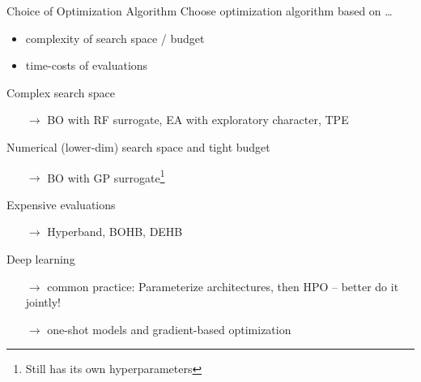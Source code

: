 \begin{frame}{Choice of Optimization Algorithm}
  Choose optimization algorithm based on \ldots
  \begin{itemize}
    \item complexity of search space / budget
    \item time-costs of evaluations
  \end{itemize}

  \vspace{0.5em}

  Complex search space
  \begin{itemize}
    \item[$\rightarrow$] BO with RF surrogate, EA with exploratory character, TPE 
  \end{itemize}
  \pause
  Numerical (lower-dim) search space and tight budget
  \begin{itemize}
    \item[$\rightarrow$] BO with GP surrogate\footnote{Still has its own hyperparameters }
  \end{itemize}
  \pause
  Expensive evaluations
  \begin{itemize}
    \item[$\rightarrow$] Hyperband, BOHB, DEHB
  \end{itemize}
  \pause
  Deep learning 
  \begin{itemize}
    \item[$\rightarrow$] common practice: Parameterize architectures, then HPO -- better do it jointly!
    \item[$\rightarrow$] one-shot models and gradient-based optimization
  \end{itemize}

\end{frame}



